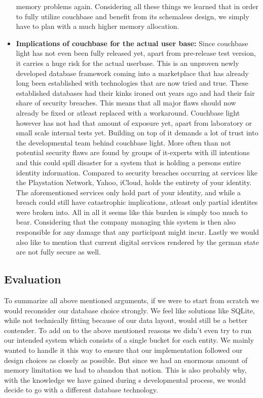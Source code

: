 \begin{itemize}
memory problems again.
Considering all these things we learned that in order to fully utilize couchbase and benefit from its schemaless design, we simply have to plan with a much higher memory allocation.
\item \label{db_crit_three} \textbf{Implications of couchbase for the actual user base:}
Since couchbase light has not even been fully released yet, apart from pre-release test version, it carries a huge risk for the actual userbase. This is an unproven newly developed database framework coming into a marketplace that has already long been established with technologies that are now tried and true.
These established databases had their kinks ironed out years ago and had their fair share of security breaches. This means that all major flaws should now already be fixed or atleast replaced with a workaround. Couchbase light however has not had that amount of exposure yet, apart from laboratory or small scale internal tests yet.
Building on top of it demands a lot of trust into the developmental team behind couchbase light. More often than not potential security flaws are found by groups of it-experts with ill intentions and this could spill disaster for a system that is holding a persons entire identity information.\cite{biggestCyberSecurityDisasters2017}
Compared to security breaches occurring at services like the Playstation Network, Yahoo, iCloud, \projectName{} holds the entirety of your identity. The aforementioned services only hold part of your identity, and while a breach could still have catastrophic implications, atleast only partial identites were broken into.
All in all it seems like this burden is simply too much to bear. Considering that the company managing this system is then also responsible for any damage that any participant might incur. Lastly we would also like to mention that current digital services rendered by the german state are not fully secure as well.\cite{cccNewIdBroken,cccNewIdProblems}
\end{itemize}

\subsection{Evaluation}
\label{ssec:databaseEvalEval}
To summarize all above mentioned arguments, if we were to start from scratch we would reconsider our database choice strongly. We feel like solutions like SQLite, while not technically fitting because of our data layout, would still be a better contender.
To add on to the above mentioned reasons we didn't even try to run our intended system which consists of a single bucket for each entity. We mainly wanted to handle it this way to ensure that our implementation followed our design choices as closely as possible.
But since we had an enormous amount of memory limitation we had to abandon that notion. This is also probably why, with the knowledge we have gained during \projectName{}s developmental process, we would decide to go with a different database technology.

